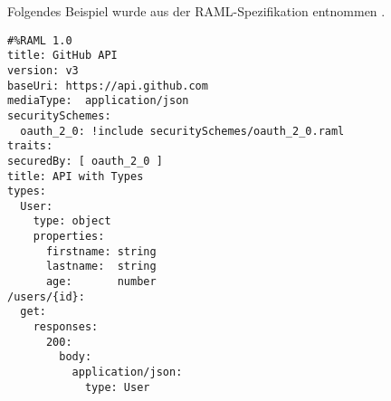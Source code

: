 Folgendes Beispiel wurde aus der RAML-Spezifikation entnommen \parencite{ramlspec}.

\begin{lstlisting}
#%RAML 1.0
title: GitHub API
version: v3
baseUri: https://api.github.com
mediaType:  application/json
securitySchemes:
  oauth_2_0: !include securitySchemes/oauth_2_0.raml
traits:
securedBy: [ oauth_2_0 ]
title: API with Types
types:
  User:
    type: object
    properties:
      firstname: string
      lastname:  string
      age:       number
/users/{id}:
  get:
    responses:
      200:
        body:
          application/json:
            type: User
\end{lstlisting}